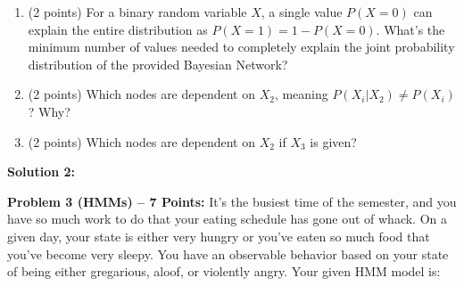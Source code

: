 \documentclass[]{article}
\begin{document}
\begin{enumerate}[label=(\alph*)]
    \item (2 points) For a binary random variable $X$, a single value $P(X=0)$ can explain the entire distribution as $P(X=1) = 1-P(X=0)$. What's the minimum number of values needed to completely explain the joint probability distribution of the provided Bayesian Network?
    \item (2 points) Which nodes are dependent on $X_2$, meaning $P(X_i|X_2) \neq P(X_i)$? Why?
    \item (2 points) Which nodes are dependent on $X_2$ if $X_3$ is given?
\end{enumerate}
\bigskip

\textbf{Solution 2:}

\clearpage

\textbf{Problem 3 (HMMs) -- 7 Points:}
It's the busiest time of the semester, and you have so much work to do that your eating schedule has gone out of whack. On a given day, your state is either very hungry or you've eaten so much food that you've become very sleepy. You have an observable behavior based on your state of being either gregarious, aloof, or violently angry. Your given HMM model is:
\end{document}
